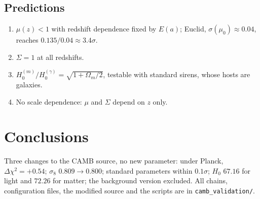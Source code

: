 \subsection{Predictions}
\begin{enumerate}
\item $\mu(z)<1$ with redshift dependence fixed by $E(a)$; Euclid, $\sigma(\mu_0)\approx0.04$, reaches $0.135/0.04\approx3.4\sigma$.
\item $\Sigma=1$ at all redshifts.
\item $H_0^{(m)}/H_0^{(\gamma)}=\sqrt{1+\Omega_m/2}$, testable with standard sirens, whose hosts are galaxies.
\item No scale dependence: $\mu$ and $\Sigma$ depend on $z$ only.
\end{enumerate}

\section{Conclusions}
Three changes to the CAMB source, no new parameter: under Planck, $\Delta\chi^2=+0.54$; $\sigma_8$ $0.809\to0.800$; standard parameters within $0.1\sigma$;
$H_0$ $67.16$ for light and $72.26$ for matter; the background version excluded. All chains, configuration files, the modified source and the scripts are in
\texttt{camb\_validation/}.
